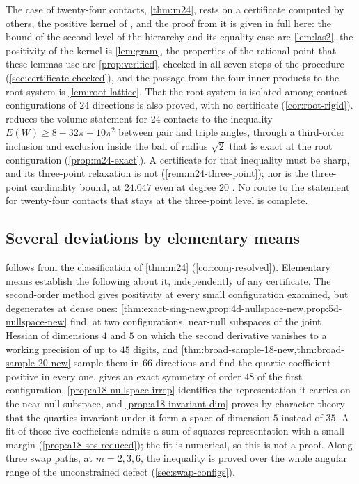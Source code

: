 \documentclass[11pt,reqno]{amsart}
\renewcommand{\_}{\origunderscore\allowbreak}
\numberwithin{equation}{section}
\theoremstyle{plain}
\theoremstyle{definition}
\theoremstyle{remark}
\begin{document}
The case of twenty-four contacts, \cref{thm:m24}, rests on a
certificate computed by others, the positive kernel of \cite{LLM24}, and
the proof from it is given in full here: the bound of the second level of the hierarchy and its equality case
are \cref{lem:las2}, the positivity of the kernel is \cref{lem:gram}, the
properties of the rational point that these lemmas use are
\cref{prop:verified}, checked in all seven steps of the procedure
(\cref{sec:certificate-checked}), and the passage from the four inner
products to the root system is \cref{lem:root-lattice}. That the root
system is isolated among contact configurations of $24$ directions is
also proved, with no certificate (\cref{cor:root-rigid}).
 reduces the volume statement for $24$ contacts to
the inequality $E(W)\ge8-32\pi+10\pi^2$ between pair and triple angles,
through a third-order inclusion and exclusion inside the ball of radius
$\sqrt2$ that is exact at the root configuration (\cref{prop:m24-exact}).
A certificate for that inequality must be sharp, and its three-point
relaxation is not (\cref{rem:m24-three-point}); nor is the three-point
cardinality bound, at $24.047$ even at degree $20$ \cite{Lei25}. No route
to the statement for twenty-four contacts that stays at the three-point
level is complete.

\subsection{Several deviations by elementary means}

 follows from the classification of
\cref{thm:m24} (\cref{cor:conj-resolved}). Elementary means establish the
following about it, independently of any certificate. The second-order
method gives positivity at every small configuration examined, but
degenerates at dense ones:
\cref{thm:exact-sing-new,prop:4d-nullspace-new,prop:5d-nullspace-new}
find, at two configurations, near-null subspaces of the joint Hessian of
dimensions $4$ and $5$ on which the second derivative vanishes to a working
precision of up to $45$ digits, and
\cref{thm:broad-sample-18-new,thm:broad-sample-20-new} sample them in $66$
directions and find the quartic coefficient positive in every one.
 gives an exact symmetry of order $48$ of the
first configuration, \cref{prop:a18-nullspace-irrep} identifies the
representation it carries on the near-null subspace, and
\cref{prop:a18-invariant-dim} proves by character theory that the quartics
invariant under it form a space of dimension $5$ instead of $35$. A fit of
those five coefficients admits a sum-of-squares representation with a small
margin (\cref{prop:a18-sos-reduced}); the fit is numerical, so this is
not a proof. Along three swap paths, at $m=2,3,6$, the
inequality is proved over the whole angular range of the unconstrained
defect (\cref{sec:swap-configs}).
\end{document}
